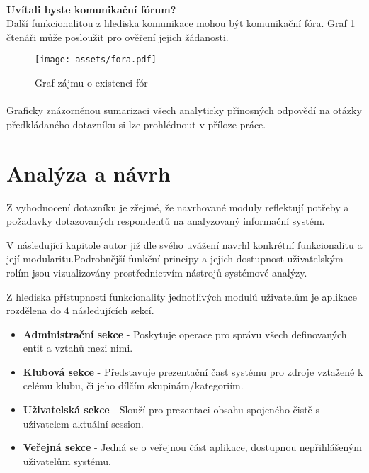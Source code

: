 \documentclass[11pt,oneside]{fithesis}
\begin{document}
                \paragraph*{}
                \noindent
                \textbf{Uvítali byste komunikační fórum?}\\
                Další funkcionalitou z hlediska komunikace mohou být komunikační fóra. Graf \ref{anal-fora} čtenáři může posloužit pro ověření jejich žádanosti.\\
                \begin{figure}
                \centering
                \mbox{\texttt{[image: assets/fora.pdf]}}
                \caption{Graf zájmu o existenci fór \label{anal-fora}}
                \end{figure}

                \paragraph*{}
                \noindent
                Graficky znázorněnou sumarizaci všech analyticky přínosných odpovědí na otázky předkládaného dotazníku si lze prohlédnout v příloze práce.

        \section{Analýza a návrh}

        Z vyhodnocení dotazníku je zřejmé, že navrhované moduly reflektují potřeby a požadavky dotazovaných respondentů na analyzovaný informační systém. 

        V následující kapitole autor již dle svého uvážení navrhl konkrétní funkcionalitu a její modularitu.Podrobnější funkční principy a jejich dostupnost uživatelským rolím jsou vizualizovány prostřednictvím nástrojů systémové analýzy.

        Z hlediska přístupnosti funkcionality jednotlivých modulů uživatelům je aplikace rozdělena do 4 následujících sekcí.

        \begin{itemize} \label{def-sekce-aplikace}
            \item \textbf{Administrační sekce} - Poskytuje operace pro správu všech definovaných entit a vztahů mezi nimi.
            \item \textbf{Klubová sekce} - Představuje prezentační čast systému pro zdroje vztažené k celému klubu, či jeho dílčím skupinám/kategoriím.
            \item \textbf{Uživatelská sekce} - Slouží pro prezentaci obsahu spojeného čistě s uživatelem aktuální session.
            \item \textbf{Veřejná sekce} - Jedná se o veřejnou část aplikace, dostupnou nepřihlášeným uživatelům systému.
        \end{itemize}
\end{document}
